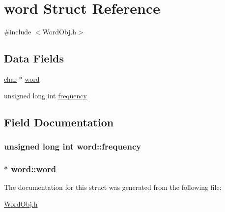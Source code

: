 \hypertarget{structword}{\section{word Struct Reference}
\label{structword}
}


{\ttfamily \#include $<$Word\-Obj.\-h$>$}

\subsection*{Data Fields}
\begin{DoxyCompactItemize}
\item 
\hyperlink{wf_8c_ab4771625a6a6b50b256ed1a164561cc5}{char} $\ast$ \hyperlink{structword_ab61c2e3515e49db21dcaa922463c367d}{word}
\item 
unsigned long int \hyperlink{structword_ae32eaefd219ec7fed4ab5c3304fa9fc3}{frequency}
\end{DoxyCompactItemize}


\subsection{Field Documentation}
\hypertarget{structword_ae32eaefd219ec7fed4ab5c3304fa9fc3}{
\subsubsection[{frequency}]{\setlength{\rightskip}{0pt plus 5cm}unsigned long int word\-::frequency}}\label{structword_ae32eaefd219ec7fed4ab5c3304fa9fc3}
\hypertarget{structword_ab61c2e3515e49db21dcaa922463c367d}{
\subsubsection[{word}]{$\ast$ word\-::word}}\label{structword_ab61c2e3515e49db21dcaa922463c367d}


The documentation for this struct was generated from the following file\-:\begin{DoxyCompactItemize}
\item 
\hyperlink{WordObj_8h}{Word\-Obj.\-h}\end{DoxyCompactItemize}
